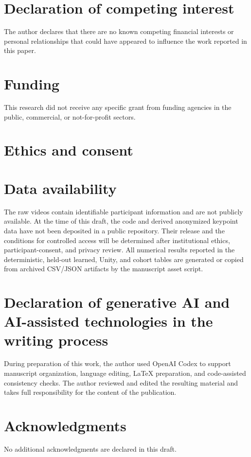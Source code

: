\section*{Declaration of competing interest}
The author declares that there are no known competing financial interests or
personal relationships that could have appeared to influence the work reported
in this paper.

\section*{Funding}
This research did not receive any specific grant from funding agencies in the
public, commercial, or not-for-profit sectors.

\section*{Ethics and consent}

\section*{Data availability}
The raw videos contain identifiable participant information and are not
publicly available. At the time of this draft, the code and derived anonymized
keypoint data have not been deposited in a public repository. Their release and
the conditions for controlled access will be determined after institutional
ethics, participant-consent, and privacy review. All numerical results reported
in the deterministic, held-out learned, Unity, and cohort tables are generated
or copied from archived CSV/JSON artifacts by the manuscript asset script.

\section*{Declaration of generative AI and AI-assisted technologies in the
writing process}
During preparation of this work, the author used OpenAI Codex to support
manuscript organization, language editing, LaTeX preparation, and code-assisted
consistency checks. The author reviewed and edited the resulting material and
takes full responsibility for the content of the publication.

\section*{Acknowledgments}
No additional acknowledgments are declared in this draft.

